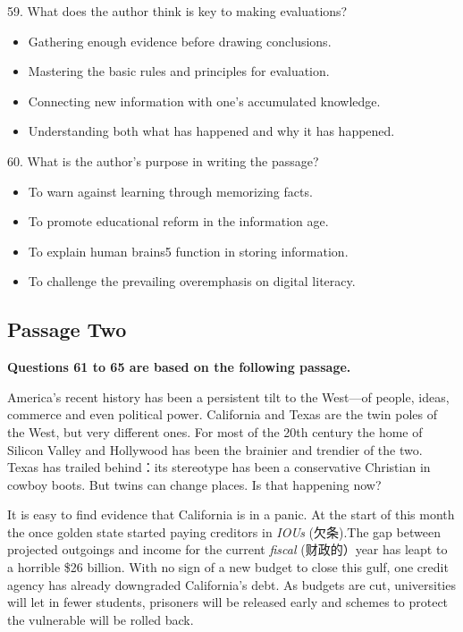 \documentclass[UTF8,11pt]{ctexart}
\begin{document}
59. What does the author think is key to making evaluations?


\begin{itemize}[leftmargin=2em,itemsep=.2em,topsep=.4em]\item[A.] Gathering enough evidence before drawing conclusions.
\item[B.] Mastering the basic rules and principles for evaluation.
\item[C.] Connecting new information with one’s accumulated knowledge.
\item[D.] Understanding both what has happened and why it has happened.
\end{itemize}

60. What is the author’s purpose in writing the passage?


\begin{itemize}[leftmargin=2em,itemsep=.2em,topsep=.4em]\item[A.] To warn against learning through memorizing facts.
\item[B.] To promote educational reform in the information age.
\item[C.] To explain human brains5 function in storing information.
\item[D.] To challenge the prevailing overemphasis on digital literacy.
\end{itemize}

\subsection*{\textbf{Passage Two}}


\textbf{Questions 61 to 65 are based on the following passage.}


America’s recent history has been a persistent tilt to the West—of people, ideas, commerce and even political power. California and Texas are the twin poles of the West, but very different ones. For most of the 20th century the home of Silicon Valley and Hollywood has been the brainier and trendier of the two. Texas has trailed behind：its stereotype has been a conservative Christian in cowboy boots. But twins can change places. Is that happening now?


It is easy to find evidence that California is in a panic. At the start of this month the once golden state started paying creditors in\textit{ IOUs} (欠条).The gap between projected outgoings and income for the current\textit{ fiscal} (财政的）year has leapt to a horrible \$26 billion. With no sign of a new budget to close this gulf, one credit agency has already downgraded California’s debt. As budgets are cut, universities will let in fewer students, prisoners will be released early and schemes to protect the vulnerable will be rolled back.
\end{document}
